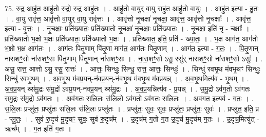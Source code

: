 \documentclass[17pt]{extarticle}
\begin{document}
75. रु॒द्र आहु॑त॒ आहु॑तो रु॒द्रो रु॒द्र आहु॑तः । . आहु॑तो वा॒युर् वा॒यु राहु॑त॒ आहु॑तो वा॒युः । . आहु॑त॒ इत्या - हु॒तः॒ । . वा॒यु रावृ॑त्त॒ आवृ॑त्तो वा॒युर् वा॒यु रावृ॑त्तः । . आवृ॑त्तो नृ॒चक्षा॑ नृ॒चक्षा॒ आवृ॑त्त॒ आवृ॑त्तो नृ॒चक्षाः᳚ । . आवृ॑त्त॒ इत्या - वृ॒त्तः॒ । . नृ॒चक्षाः॒ प्रति॑ख्यातः॒ प्रति॑ख्यातो नृ॒चक्षा॑ नृ॒चक्षाः॒ प्रति॑ख्यातः । . नृ॒चक्षा॒ इति॑ नृ - चक्षाः᳚ । . प्रति॑ख्यातो भ॒क्षो भ॒क्षः प्रति॑ख्यातः॒ प्रति॑ख्यातो भ॒क्षः । . प्रति॑ख्यात॒ इति॒ प्रति॑ - ख्या॒तः॒ । . भ॒क्ष आग॑त॒ आग॑तो भ॒क्षो भ॒क्ष आग॑तः । . आग॑तः पितृ॒णाम् पि॑तृ॒णा माग॑त॒ आग॑तः पितृ॒णाम् । . आग॑त॒ इत्या - ग॒तः॒ । . पि॒तृ॒णान् ना॑राशꣳ॒॒सो ना॑राशꣳ॒॒सः पि॑तृ॒णाम् पि॑तृ॒णान् ना॑राशꣳ॒॒सः । . ना॒रा॒शꣳ॒॒सो ऽसु॒ रसु॑र् नाराशꣳ॒॒सो ना॑राशꣳ॒॒सो ऽसुः॑ । . असु॒ रात्त॒ आत्तो ऽसु॒ रसु॒ रात्तः॑ । . आत्तः॒ सिन्धुः॒ सिन्धु॒ रात्त॒ आत्तः॒ सिन्धुः॑ । . सिन्धु॑ रवभृ॒थ म॑वभृ॒थꣳ सिन्धुः॒ सिन्धु॑ रवभृ॒थम् । . अ॒व॒भृ॒थ म॑वप्र॒यन्-न॑वप्र॒यन्-न॑वभृ॒थ म॑वभृ॒थ म॑वप्र॒यन्न् । . अ॒व॒भृ॒थमित्य॑व - भृ॒थम् । . अ॒व॒प्र॒यन् थ्स॑मु॒द्रः स॑मु॒द्रो॑ ऽवप्र॒यन्-न॑वप्र॒यन् थ्स॑मु॒द्रः । . अ॒व॒प्र॒यन्नित्य॑व - प्र॒यन्न् । . स॒मु॒द्रो ऽव॑ग॒तो ऽव॑गतः समु॒द्रः स॑मु॒द्रो ऽव॑गतः । . अव॑गतः सलि॒लः स॑लि॒लो ऽव॑ग॒तो ऽव॑गतः सलि॒लः । . अव॑गत॒ इत्यव॑ - ग॒तः॒ । . स॒लि॒लः प्रप्लु॑तः॒ प्रप्लु॑तः सलि॒लः स॑लि॒लः प्रप्लु॑तः । . प्रप्लु॑तः॒ सुवः॒ सुवः॒ प्रप्लु॑तः॒ प्रप्लु॑तः॒ सुवः॑ । . प्रप्लु॑त॒ इति॒ प्र - प्लु॒तः॒ । . सुव॑ रु॒दृच॑ मु॒दृचꣳ॒॒ सुवः॒ सुव॑ रु॒दृच᳚म् । . उ॒दृच॑म् ग॒तो ग॒त उ॒दृच॑ मु॒दृच॑म् ग॒तः । . उ॒दृच॒मित्यु॑त् - ऋच᳚म् । . ग॒त इति॑ ग॒तः । \newline
\end{document}
